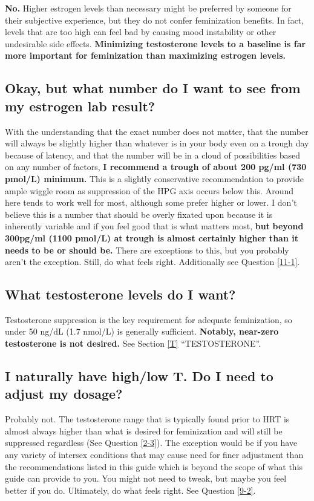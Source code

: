 \documentclass{article}
\begin{document}
{{\textbf{No.} Higher estrogen levels than necessary might be preferred by someone for their subjective experience, but they do not confer feminization benefits. In fact, levels that are too high can feel bad by causing mood instability or other undesirable side effects. \textbf{Minimizing testosterone levels to a baseline is far more important for feminization than maximizing estrogen levels.}

\subsection{Okay, but what number do I want to see from my estrogen lab result?}

With the understanding that the exact number does not matter, that the number will always be slightly higher than whatever is in your body even on a trough day because of latency, and that the number will be in a cloud of possibilities based on any number of factors, \textbf{I recommend a trough of about 200 pg/ml (730 pmol/L) minimum.} This is a slightly conservative recommendation to provide ample wiggle room as suppression of the HPG axis occurs below this. Around here tends to work well for most, although some prefer higher or lower. I don’t believe this is a number that should be overly fixated upon because it is inherently variable and if you feel good that is what matters most, \textbf{but} \textbf{beyond 300pg/ml (1100 pmol/L) at trough is almost certainly higher than it needs to be or should be.} There are exceptions to this, but you probably aren't the exception. Still, do what feels right. Additionally see Question \ref{11-1}.

\subsection{What testosterone levels do I want?}

Testosterone suppression is the key requirement for adequate feminization, so under 50 ng/dL (1.7 nmol/L) is generally sufficient. \textbf{Notably, near-zero testosterone is not desired.} See Section \ref{T} “TESTOSTERONE”.

\subsection{I naturally have high/low T. Do I need to adjust my dosage?}

Probably not. The testosterone range that is typically found prior to HRT is almost always higher than what is desired for feminization and will still be suppressed regardless (See Question \ref{2-3}). The exception would be if you have any variety of intersex conditions that may cause need for finer adjustment than the recommendations listed in this guide which is beyond the scope of what this guide can provide to you. You might not need to tweak, but maybe you feel better if you do. Ultimately, do what feels right. See Question \ref{9-2}.

}}
\end{document}
